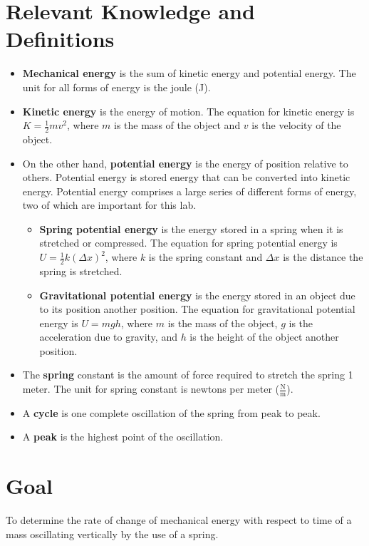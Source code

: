 \documentclass{article}
\begin{document}
    \section{Relevant Knowledge and Definitions}\label{sec:relevant-knowledge-and-definitions}
        \begin{itemize}
            \item \textbf{Mechanical energy} is the sum of kinetic energy and potential energy.
            The unit for all forms of energy is the joule (J).
            \item \textbf{Kinetic energy} is the energy of motion.
            The equation for kinetic energy is $K = \frac{1}{2}mv^2$, where $m$ is the mass of the object and $v$ is the velocity of the object.
            \item On the other hand, \textbf{potential energy} is the energy of position relative to others.
            Potential energy is stored energy that can be converted into kinetic energy.
            Potential energy comprises a large series of different forms of energy, two of which are important for this lab.
            \begin{itemize}
                \item \textbf{Spring potential energy} is the energy stored in a spring when it is stretched or compressed.
                The equation for spring potential energy is $U = \frac{1}{2}k(\Delta x)^2$, where $k$ is the spring constant and $\Delta x$ is the distance the spring is stretched.
                \item \textbf{Gravitational potential energy} is the energy stored in an object due to its position another position.
                The equation for gravitational potential energy is $U = mgh$, where $m$ is the mass of the object, $g$ is the acceleration due to gravity, and $h$ is the height of the object another position.
            \end{itemize}
            \item The \textbf{spring} constant is the amount of force required to stretch the spring 1 meter.
            The unit for spring constant is newtons per meter ($\frac{\text{N}}{\text{m}}$).
            \item A \textbf{cycle} is one complete oscillation of the spring from peak to peak.
            \item A \textbf{peak} is the highest point of the oscillation.
        \end{itemize}

    \section{Goal}\label{sec:goal}
        To determine the rate of change of mechanical energy with respect to time of a mass oscillating vertically by the use of a spring.
    
\end{document}
